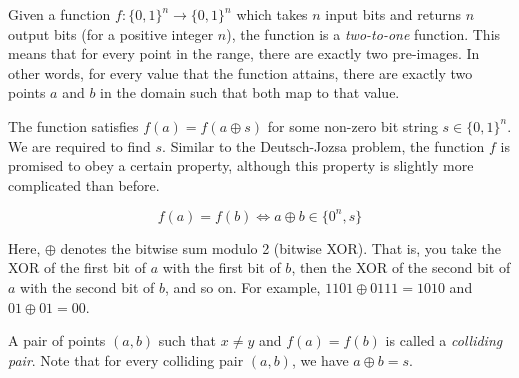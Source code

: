 \begin{definition}
    Given a function $f:\{0,1\}^n \rightarrow \{0,1\}^n$ which takes $n$ input bits and returns $n$ output bits (for a positive integer $n$), the function is a \textit{two-to-one} function. This means that for every point in the range, there are exactly two pre-images. In other words, for every value that the function attains, there are exactly two points $a$ and $b$ in the domain such that both map to that value.

    The function satisfies $f(a) = f(a \oplus s)$ for some non-zero bit string $s \in \{0,1\}^n$. We are required to find $s$. Similar to the Deutsch-Jozsa problem, the function $f$ is promised to obey a certain property, although this property is slightly more complicated than before.

    \[
    f(a) = f(b) \iff a \oplus b \in \{0^n, s\}
    \]

    Here, $\oplus$ denotes the bitwise sum modulo 2 (bitwise XOR). That is, you take the XOR of the first bit of $a$ with the first bit of $b$, then the XOR of the second bit of $a$ with the second bit of $b$, and so on. For example, $1101 \oplus 0111 = 1010$ and $01 \oplus 01 = 00$.

    A pair of points $(a, b)$ such that $x \neq y$ and $f(a) = f(b)$ is called a \textit{colliding pair}. Note that for every colliding pair $(a, b)$, we have $a \oplus b = s$.
\end{definition}


